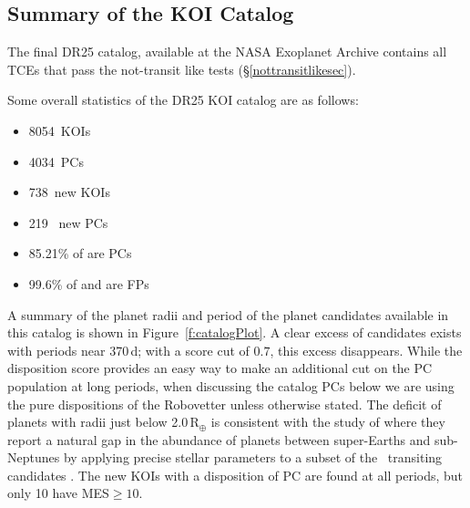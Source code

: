 \def \nkois {8054}
\def \ncand {4034}
\def \newkois {738}
\def \newcand {219}
\def \completeness {85.21}
\def \reliability {97.14}
\def \effectiveness {99.6}

\subsection{Summary of the KOI Catalog}

The final DR25 catalog, available at the NASA Exoplanet Archive contains all TCEs that pass the not-transit like tests (\S\ref{nottransitlikesec}). 


Some overall statistics of the DR25 KOI catalog are as follows:
\begin{itemize}
    \item \nkois{}~KOIs
    \item \ncand{}~PCs
    \item \newkois{}~new KOIs
    \item \newcand{}~ new PCs
    \item \completeness{}\% of  are PCs
    \item \effectiveness{}\% of  and  are FPs
\end{itemize}

A summary of the planet radii and period of the planet candidates available in this catalog is shown in Figure~\ref{f:catalogPlot}. A clear excess of candidates exists with periods near 370\,d;  with a score cut of $0.7$, this excess disappears. While the disposition score provides an easy way to make an additional cut on the PC population at long periods, when discussing the catalog PCs below we are using the pure dispositions of the Robovetter unless otherwise stated. The deficit of planets with radii just below 2.0\,R$_{\oplus}$ is consistent with the study of \citet{Fulton2017} where they report a natural gap in the abundance of planets between super-Earths and sub-Neptunes by applying precise stellar parameters to a subset of the \kepler\ transiting candidates \citep{CKS1,CKS2}. The new KOIs with a disposition of PC are found at all periods, but only 10 have MES$\geq 10 $. 


